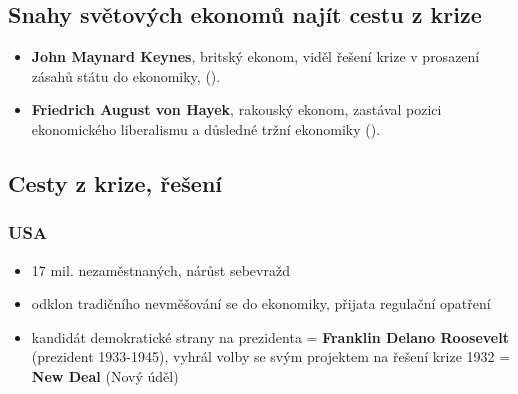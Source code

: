 \documentclass{article}
\begin{document}
\subsection*{Snahy světových ekonomů najít cestu z krize}
\begin{itemize}
    \item \textbf{John Maynard Keynes}, britský ekonom, viděl řešení krize v prosazení zásahů státu do ekonomiky,   ().
    \item \textbf{Friedrich August von Hayek}, rakouský ekonom, zastával pozici ekonomického liberalismu a důsledné tržní ekonomiky ().
\end{itemize}

\subsection*{Cesty z krize, řešení}

\subsubsection*{USA}
\begin{itemize}
    \item 17 mil. nezaměstnaných, nárůst sebevražd
    \item odklon tradičního nevměšování se do ekonomiky, přijata regulační opatření
    \item kandidát demokratické strany na prezidenta = \textbf{Franklin Delano Roosevelt} (prezident 1933-1945), vyhrál volby se svým projektem na řešení krize 1932 = \textbf{New Deal} (Nový úděl)
\end{itemize}
\end{document}
